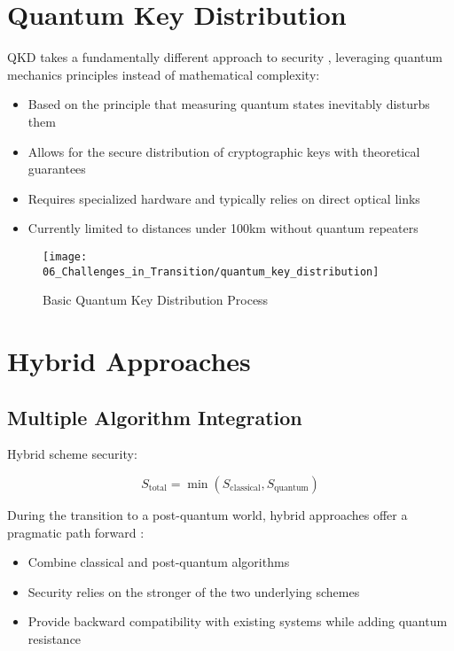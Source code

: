 \section{Quantum Key Distribution}
QKD takes a fundamentally different approach to security \parencite{wehner2018quantum}, leveraging quantum mechanics principles instead of mathematical complexity:

\begin{itemize}
    \item Based on the principle that measuring quantum states inevitably disturbs them
    \item Allows for the secure distribution of cryptographic keys with theoretical guarantees
    \item Requires specialized hardware and typically relies on direct optical links
    \item Currently limited to distances under 100km without quantum repeaters
\end{itemize}

\begin{figure}[h]
    \centering
    \texttt{[image: 06\_Challenges\_in\_Transition/quantum\_key\_distribution]}
    \caption{Basic Quantum Key Distribution Process}
    \label{fig:qkd-process}
\end{figure}

\section{Hybrid Approaches}\label{sec:pqc_hybrid}

\subsection{Multiple Algorithm Integration}\label{subsec:multi_algo}
Hybrid scheme security:

\begin{equation}\label{eq:pqc_hybrid_security}
    S_{\text{total}} = \min(S_{\text{classical}}, S_{\text{quantum}})
\end{equation}

During the transition to a post-quantum world, hybrid approaches offer a pragmatic path forward \parencite{bernstein2017post}:

\begin{itemize}
    \item Combine classical and post-quantum algorithms
    \item Security relies on the stronger of the two underlying schemes
    \item Provide backward compatibility with existing systems while adding quantum resistance
\end{itemize}

